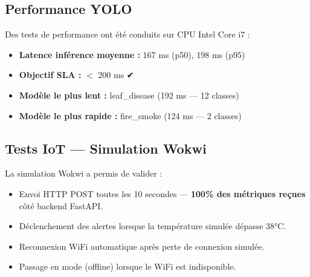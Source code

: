 \subsection{Performance YOLO}

Des tests de performance ont été conduits sur CPU Intel Core i7 :

\begin{itemize}
  \item \textbf{Latence inférence moyenne :} 167 ms (p50), 198 ms (p95)
  \item \textbf{Objectif SLA :} $<$ 200 ms ✔
  \item \textbf{Modèle le plus lent :} leaf\_disease (192 ms — 12 classes)
  \item \textbf{Modèle le plus rapide :} fire\_smoke (124 ms — 2 classes)
\end{itemize}

\subsection{Tests IoT — Simulation Wokwi}

La simulation Wokwi a permis de valider :
\begin{itemize}
  \item Envoi HTTP POST toutes les 10 secondes — \textbf{100\% des métriques reçues}
        côté backend FastAPI.
  \item Déclenchement des alertes  lorsque la température
        simulée dépasse 38°C.
  \item Reconnexion WiFi automatique après perte de connexion simulée.
  \item Passage en mode  (offline) lorsque le WiFi est indisponible.
\end{itemize}
